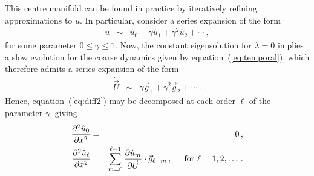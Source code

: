 \documentclass[12pt,a5paper]{article}
\begin{document}
This centre manifold can be found in practice by iteratively refining approximations to $u$. In particular, consider a series expansion of the form
\begin{eqnarray}
	u  & \sim & \hat{u}_0+\gamma\hat{u}_1+\gamma^2\hat{u}_2+\cdots\,,
\label{eq:u:series}
\end{eqnarray}
for some parameter $0\le\gamma\le 1$.
Now, the constant eigensolution for $\lambda=0$ implies a slow evolution for the coarse dynamics given by 
equation~(\ref{eq:temporal}), which therefore admits a series expansion of the form
\begin{eqnarray}
	\dot{{\vec U}} & \sim & \gamma {\vec g}_1+\gamma^2 {\vec g}_2+\cdots\,.
\end{eqnarray}
Hence, equation~(\ref{eq:diff2}) may be decomposed at each order 
$\ell$ of the parameter $\gamma$, giving
\begin{eqnarray}
   \DD {x}{\hat{u}_0} & = & 0\,, \label{eq:pert1}
\\
  \DD {x}{\hat{u}_\ell} & = & \sum_{m=0}^{\ell-1}\D {\vec U}{\hat{u}_m}\cdot{\vec g}_{\ell-m}\,,
\hspace*{5mm}\mbox{for }\ell=1,2,\ldots\,.
\label{eq:pert_ell}
\end{eqnarray}
\end{document}
